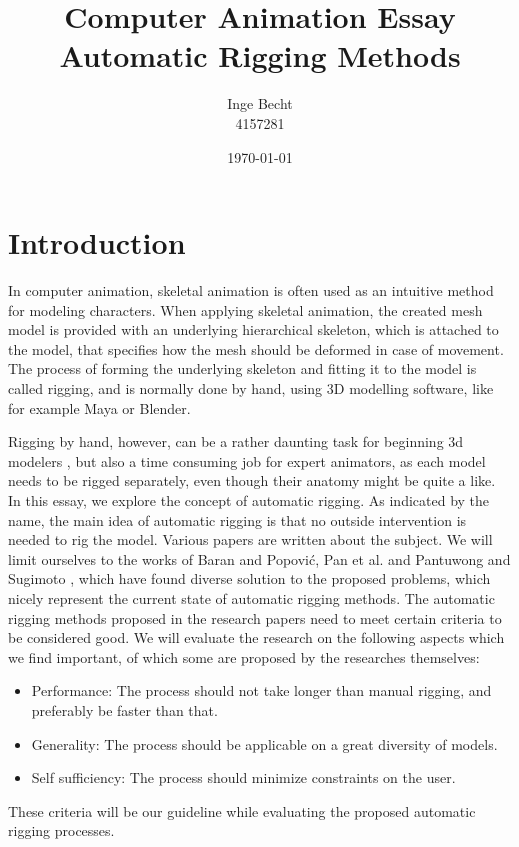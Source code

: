 \documentclass{article}
\title{Computer Animation Essay\\ Automatic Rigging Methods}
\author{Inge Becht\\ 4157281}
\date{\today}
\begin{document}
\maketitle

\section{Introduction}
In computer animation, skeletal animation is often used as an intuitive method
for modeling characters. When applying skeletal animation, the created mesh
model is provided with an underlying hierarchical skeleton, which is attached to
the model, that specifies how the mesh should be deformed in case of movement. The process of forming
the underlying skeleton and fitting it to the model is called rigging, and is
normally done by hand, using 3D modelling software, like for example Maya or
Blender.

Rigging by hand, however, can be a rather daunting task for beginning 3d
modelers \citep{paper1}, but also a time consuming job for expert animators, as
each model needs to be rigged separately, even though their anatomy might be
quite a like.
In this essay, we explore the concept of automatic rigging. As indicated by the
name, the main idea of automatic rigging is that no outside intervention is
needed to rig the model.
Various papers are written about the subject. We will limit ourselves to
the works of Baran and Popovi\'{c}\citep{paper1}, Pan et al. \citep{paper2} and
Pantuwong and Sugimoto \citep{paper3}, which have found
diverse solution to the proposed problems, which nicely represent the current
state of automatic rigging methods.
The automatic rigging methods proposed in the research papers need to meet
certain criteria to be considered good. We will evaluate the research on the
following aspects which we find important, of which some are proposed by the
researches themselves:

\begin{itemize}
    \item Performance: The process should not take longer than manual rigging, and
        preferably be faster than that.
    \item Generality: The process should be applicable on a great diversity of models.
    \item Self sufficiency: The process should minimize constraints on the user.
\end{itemize}
These criteria will be our guideline while evaluating the proposed automatic rigging processes.
\end{document}
